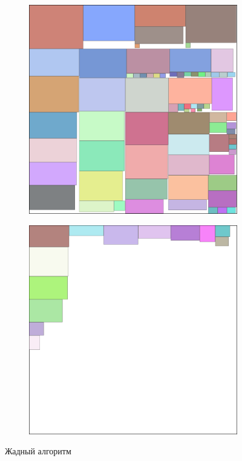 \documentclass{fefu_thesis/cls/fefu}
\begin{document}
    \begin{figure}[H]
        \centering
        \begin{subfigure}{0.49\linewidth}
            \centering
            \includegraphics[scale=0.1]{images/rect_0.png}
        \end{subfigure}
        \begin{subfigure}{0.49\linewidth}
            \centering
            \includegraphics[scale=0.1]{images/rect_1.png}
        \end{subfigure}
        \caption{Жадный алгоритм}
    \end{figure}
\end{document}
